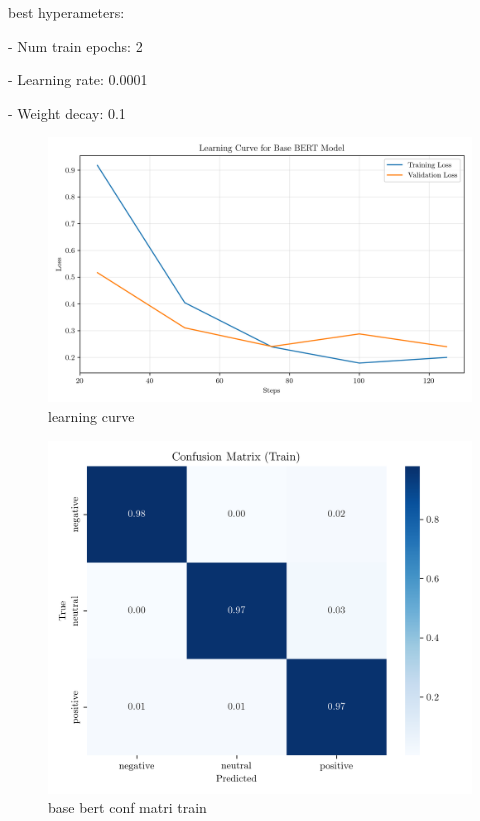 \documentclass[conference]{IEEEtran}
\begin{document}
best hyperameters: 

- Num train epochs: 2

- Learning rate: 0.0001

- Weight decay: 0.1

\begin{figure}[H]
    \centering
    \includegraphics[width=1\linewidth]{assets/base_bert_learning_curve.png}
    \caption{learning curve}
    \label{fig:base_bert_learning_curve}
\end{figure}

\begin{figure}[H]
    \centering
    \includegraphics[width=1\linewidth]{assets/base_bert_confusion_matrix_Train.png}
    \caption{base bert conf matri train}
    \label{fig:base_bert_confusion_matrix_Train}
\end{figure}
\end{document}

